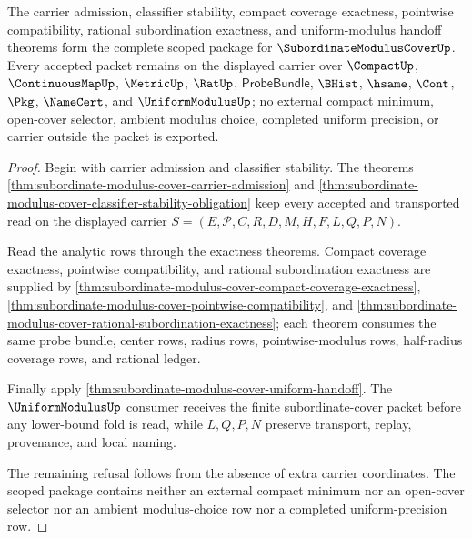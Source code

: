 \begin{theorem}
\label{thm:subordinate-modulus-cover-scoped-package}
The carrier admission, classifier stability, compact coverage exactness, pointwise compatibility, rational subordination exactness, and uniform-modulus handoff theorems form the complete scoped package for $\SubordinateModulusCoverUp$. Every accepted packet remains on the displayed carrier over $\CompactUp$, $\ContinuousMapUp$, $\MetricUp$, $\RatUp$, $\mathsf{ProbeBundle}$, $\BHist$, $\hsame$, $\Cont$, $\Pkg$, $\NameCert$, and $\UniformModulusUp$; no external compact minimum, open-cover selector, ambient modulus choice, completed uniform precision, or carrier outside the packet is exported.
\end{theorem}
\begin{proof}
Begin with carrier admission and classifier stability. The theorems \autoref{thm:subordinate-modulus-cover-carrier-admission} and \autoref{thm:subordinate-modulus-cover-classifier-stability-obligation} keep every accepted and transported read on the displayed carrier $S=(E,\mathcal{P},C,R,D,M,H,F,L,Q,P,N)$.

Read the analytic rows through the exactness theorems. Compact coverage exactness, pointwise compatibility, and rational subordination exactness are supplied by \autoref{thm:subordinate-modulus-cover-compact-coverage-exactness}, \autoref{thm:subordinate-modulus-cover-pointwise-compatibility}, and \autoref{thm:subordinate-modulus-cover-rational-subordination-exactness}; each theorem consumes the same probe bundle, center rows, radius rows, pointwise-modulus rows, half-radius coverage rows, and rational ledger.

Finally apply \autoref{thm:subordinate-modulus-cover-uniform-handoff}. The $\UniformModulusUp$ consumer receives the finite subordinate-cover packet before any lower-bound fold is read, while $L,Q,P,N$ preserve transport, replay, provenance, and local naming.

The remaining refusal follows from the absence of extra carrier coordinates. The scoped package contains neither an external compact minimum nor an open-cover selector nor an ambient modulus-choice row nor a completed uniform-precision row.
\end{proof}


